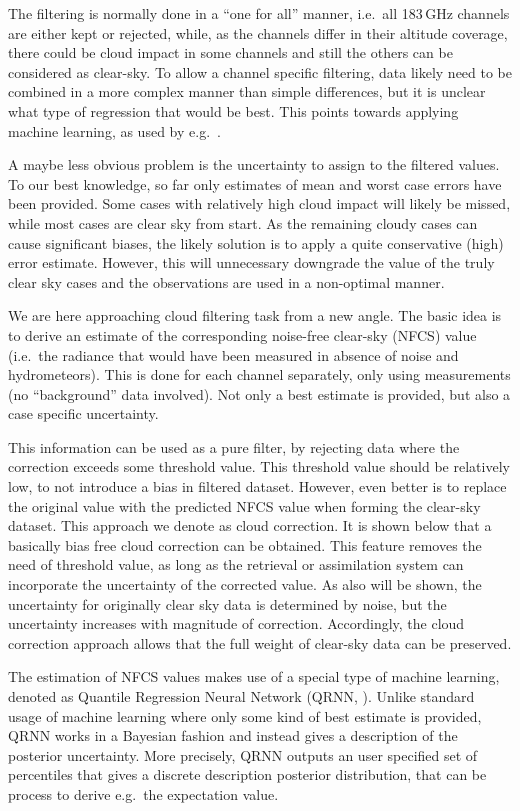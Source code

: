 \documentclass[amt]{copernicus}
\begin{document}
The filtering is normally done in a ``one for all'' manner, i.e.\ all 183\,GHz
channels are either kept or rejected, while, as the channels differ in their
altitude coverage, there could be cloud impact in some channels and still the
others can be considered as clear-sky. To allow a channel specific filtering,
data likely need to be combined in a more complex manner than simple
differences, but it is unclear what type of regression that would be best. This
points towards applying machine learning, as used by e.g.\
\citet{favrichon2019detecting}.

A maybe less obvious problem is the uncertainty to assign to the filtered
values. To our best knowledge, so far only estimates of mean and worst case
errors have been provided. Some cases with relatively high cloud impact will
likely be missed, while most cases are clear sky from start. As the remaining
cloudy cases can cause significant biases, the likely solution is to apply a
quite conservative (high) error estimate. However, this will unnecessary
downgrade the value of the truly clear sky cases and the observations are used
in a non-optimal manner.

We are here approaching cloud filtering task from a new angle. The basic idea
is to derive an estimate of the corresponding noise-free clear-sky (NFCS) value
(i.e.\ the radiance that would have been measured in absence of noise and
hydrometeors). This is done for each channel separately, only using
measurements (no ``background'' data involved). Not only a best estimate is
provided, but also a case specific uncertainty.

This information can be used as a pure filter, by rejecting data where the
correction exceeds some threshold value. This threshold value should be
relatively low, to not introduce a bias in filtered dataset. However, even
better is to replace the original value with the predicted NFCS value when
forming the clear-sky dataset. This approach we denote as cloud correction. It
is shown below that a basically bias free cloud correction can be obtained.
This feature removes the need of threshold value, as long as the retrieval or
assimilation system can incorporate the uncertainty of the corrected value. As
also will be shown, the uncertainty for originally clear sky data is determined
by noise, but the uncertainty increases with magnitude of correction.
Accordingly, the cloud correction approach allows that the full weight of
clear-sky data can be preserved.

The estimation of NFCS values makes use of a special type of machine learning,
denoted as Quantile Regression Neural Network (QRNN,
\citet{pfreundschuh:aneur:18}). Unlike standard usage of machine learning where
only some kind of best estimate is provided, QRNN works in a Bayesian fashion
and instead gives a description of the posterior uncertainty. More precisely,
QRNN outputs an user specified set of percentiles that gives a discrete
description posterior distribution, that can be process to derive e.g.\ the
expectation value.
\end{document}
